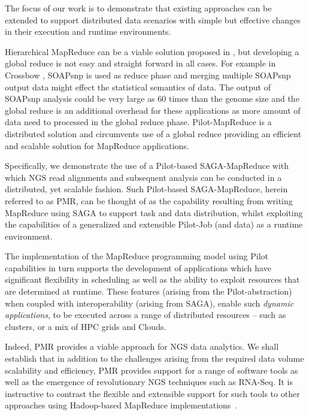\documentclass{acm_proc_article-sp}
\begin{document}
The focus of our work is to demonstrate that existing approaches can
be extended to support distributed data scenarios with simple but
effective changes in their execution and runtime environments.

Hierarchical MapReduce can be a viable solution proposed in
\cite{ecmls11-mr-autodock}, but developing a global reduce is not easy
and straight forward in all cases. For example in Crossbow
\cite{langmead2010}, SOAPsnp is used as reduce phase and merging
multiple SOAPsnp output data might effect the statistical semantics of
data. The output of SOAPsnp analysis could be very large as 60 times
than the genome size\cite{soap_snp} and the global reduce is an
additional overhead for these applications as more amount of data need
to processed in the global reduce phase. Pilot-MapReduce
\cite{pmr2012} is a distributed solution and circumvents use of a
global reduce providing an efficient and scalable solution for
MapReduce applications.


Specifically, we demonstrate the use of a Pilot-based SAGA-MapReduce
with which NGS read alignments and subsequent analysis can be
conducted in a distributed, yet scalable fashion. Such Pilot-based
SAGA-MapReduce, herein referred to as PMR, can be thought of as the
capability resulting from writing MapReduce using SAGA to support task
and data distribution, whilst exploiting the capabilities of a
generalized and extensible Pilot-Job (and data) as a runtime
environment\cite{Sehgal2011590,pmr2012,pstar11}.

The implementation of the MapReduce programming model using Pilot
capabilities in turn supports the development of applications which
have significant flexibility in scheduling as well as the ability to
exploit resources that are determined at runtime.  These features
(arising from the Pilot-abstraction) when coupled with
interoperability (arising from SAGA), enable such {\it dynamic
  applications}, to be executed across a range of distributed
resources -- such as clusters, or a mix of HPC grids and Clouds.

Indeed, PMR provides a viable approach for NGS data analytics.  We
shall establish that in addition to the challenges arising from the
required data volume scalability and efficiency, PMR provides support
for a range of software tools as well as the emergence of
revolutionary NGS techniques such as RNA-Seq.  It is instructive to
contrast the flexible and extensible support for such tools to other
approaches using Hadoop-based MapReduce
implementations~\cite{cloudburst,langmead2009,seal2011,langmead2010}.
\end{document}
